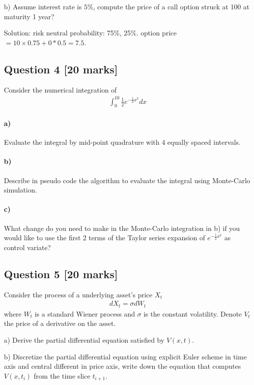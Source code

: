 \documentclass[11pt,a4paper,hidelinks,fleqn]{article}            %
\begin{document}
b) Assume interest rate is $5\%$, compute the price of a call option struck at 100 at maturity 1 year?

Solution: risk neutral probability: 75\%, 25\%. option price $= 10 \times 0.75 + 0 * 0.5 = 7.5$.


\subsection*{Question 4 [20 marks]} 
Consider the numerical integration of 
\begin{align*}
\int_0^{10} \frac{1}{2} e^{-\frac12x^2} dx
\end{align*}

\paragraph{a)} Evaluate the integral by mid-point quadrature with 4 equally spaced intervals. 

\paragraph{b)} Describe in pseudo code the algorithm to evaluate the integral using Monte-Carlo simulation.
 
\paragraph{c)} What change do you need to make in the Monte-Carlo integration in b)
if you would like to use the first 2 terms of the Taylor series
expansion of $e^{-\frac12 x^2}$ as control variate?


\subsection*{Question 5 [20 marks]}
Consider the process of a underlying asset's price $X_t$
\begin{align*}
dX_t = \sigma dW_t
\end{align*}
where $W_t$ is a standard Wiener process and $\sigma$ is the constant volatility.
Denote $V_t$ the price of a derivative on the asset. 

a) Derive the partial differential equation satisfied by $V(x, t)$.

b) Discretize the partial differential equation using explicit Euler scheme in time axis and central different in price axis,
write down the equation that computes $V(x, t_i)$ from the time slice $t_{i+1}$.
\end{document}
